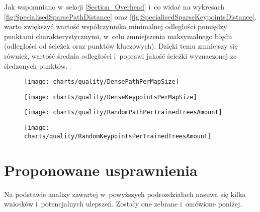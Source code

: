     Jak wspomniano w~sekcji \ref{Section_Overhead} i~co widać na wykresach \ref{fig:SpecialisedSparsePathDistance} oraz \ref{fig:SpecialisedSparseKeypointsDistance}, warto zwiększyć wartość współczynnika minimalnej odległości pomiędzy punktami charakterystycznymi, w~celu zmniejszenia maksymalnego błędu (odległości od ścieżek oraz punktów kluczowych). Dzięki temu zmniejszy się również, wartość średnia odległości i~poprawi jakość ścieżki wyznaczonej ze śledzonych punktów.

    \newpage
    \begin{figure}[!ht]
      \centering
      \texttt{[image: charts/quality/DensePathPerMapSize]}
      \caption[]
              {}
      \label{fig:DensePathPerMapSize}
    \end{figure}

    \begin{figure}[!ht]
      \centering
      \texttt{[image: charts/quality/DenseKeypointsPerMapSize]}
      \caption[]
              {}
      \label{fig:DenseKeypointsPerMapSize}
    \end{figure}

    \newpage
    \begin{figure}[!ht]
      \centering
      \texttt{[image: charts/quality/RandomPathPerTrainedTreesAmount]}
      \caption[]
              {}
      \label{fig:RandomPathPerTrainedTreesAmount}
    \end{figure}

    \begin{figure}[!ht]
      \centering
      \texttt{[image: charts/quality/RandomKeypointsPerTrainedTreesAmount]}
      \caption[]
              {}
      \label{fig:RandomKeypointsPerTrainedTreesAmount}
    \end{figure}

  \section{Proponowane usprawnienia}\label{Section_Usprawnienia}

    Na podstawie analizy zawartej w~powyższych podrozdziałach nasuwa się kilka wniosków i~potencjalnych ulepszeń. Zostały one zebrane i~omówione poniżej.

